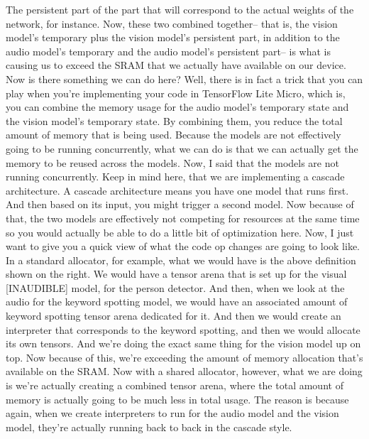     The persistent part of the part that will
     correspond to the actual weights of the network, for instance.
     Now, these two combined together-- that is,
     the vision model's temporary plus the vision model's persistent part,
     in addition to the audio model's temporary and the audio model's
     persistent part-- is what is causing us to exceed the SRAM that we actually
     have available on our device.
     Now is there something we can do here?
     Well, there is in fact a trick that you can
     play when you're implementing your code in TensorFlow Lite Micro, which
     is, you can combine the memory usage for the audio model's temporary state
     and the vision model's temporary state.
     By combining them, you reduce the total amount of memory that is being used.
     Because the models are not effectively going to be running concurrently,
     what we can do is that we can actually get the memory
     to be reused across the models.
     Now, I said that the models are not running concurrently.
     Keep in mind here, that we are implementing a cascade architecture.
     A cascade architecture means you have one model that runs first.
     And then based on its input, you might trigger a second model.
     Now because of that, the two models are effectively not competing
     for resources at the same time so you would actually
     be able to do a little bit of optimization here.
     Now, I just want to give you a quick view of what the code op
     changes are going to look like.
     In a standard allocator, for example, what we
     would have is the above definition shown on the right.
     We would have a tensor arena that is set up for the visual [INAUDIBLE] model,
     for the person detector.
     And then, when we look at the audio for the keyword spotting model,
     we would have an associated amount of keyword spotting tensor
     arena dedicated for it.
     And then we would create an interpreter that
     corresponds to the keyword spotting, and then we would allocate its own tensors.
     And we're doing the exact same thing for the vision model up on top.
     Now because of this, we're exceeding the amount of memory allocation
     that's available on the SRAM.
     Now with a shared allocator, however, what we are doing is
     we're actually creating a combined tensor arena,
     where the total amount of memory is actually
     going to be much less in total usage.
     The reason is because again, when we create interpreters
     to run for the audio model and the vision model,
     they're actually running back to back in the cascade style.
